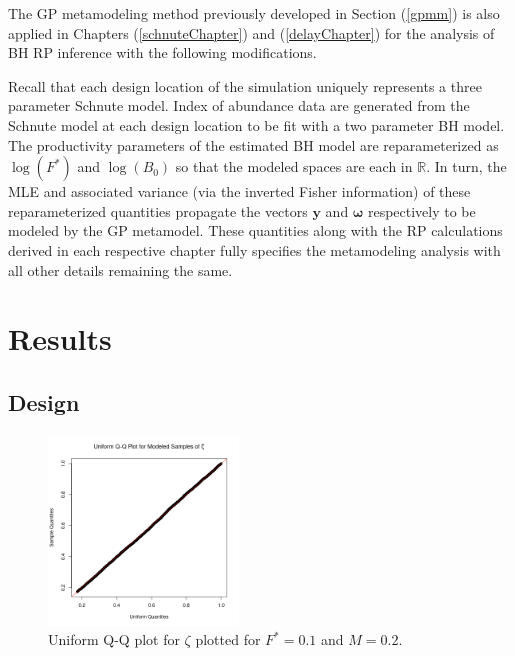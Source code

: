 %
The GP metamodeling method previously developed in Section (\ref{gpmm}) is 
also applied in Chapters (\ref{schnuteChapter}) and (\ref{delayChapter}) for the 
analysis of BH RP inference with the following modifications.

%
Recall that each design location of the simulation uniquely represents a three parameter 
Schnute model. Index of abundance data are generated from the Schnute model 
at each design location to be fit with a two parameter BH model.
The productivity parameters of the estimated BH model are reparameterized as 
$\log(F^*)$ and $\log(B_0)$ so that the modeled spaces are each in $\mathbb{R}$.
In turn, the MLE and associated variance (via the inverted Fisher information) 
of these reparameterized quantities propagate the vectors 
$\textbf{y}$ and $\bm{\omega}$ respectively to be modeled by the GP metamodel. 
These quantities along with the RP calculations derived in each respective chapter 
fully specifies the metamodeling analysis with all other details remaining the same. 

%
\clearpage
\section{Results}

%
\subsection{Design}

%
\begin{figure}
\vspace{-1.5cm}
\includegraphics[width=0.45\textwidth]{../gpBias/qqUnif.png}
\vspace{-1cm} %
\caption{Uniform Q-Q plot for $\zeta$ plotted for $F^*=0.1$ and $M=0.2$.}
\label{qqZeta}
\end{figure}

